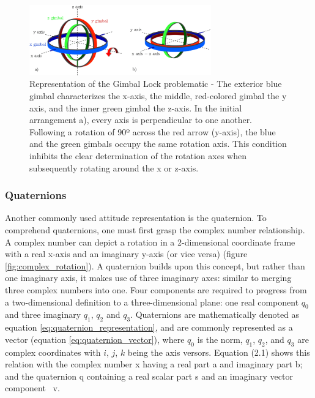 \begin{figure}[!h]
    \centering
    \includegraphics[width=0.7\textwidth]{figures/gimbal_lock.png}
    \caption{Representation of the Gimbal Lock problematic \cite{zeitlhofler2019nominal} - The exterior blue gimbal characterizes the x-axis, the middle, red-colored gimbal the y axis, and the inner green gimbal the z-axis. In the initial arrangement a), every axis is perpendicular to one another. Following a rotation of 90º across the red arrow (y-axis), the blue and the green gimbals occupy the same rotation axis. This condition inhibits the clear determination of the rotation axes when subsequently rotating around the x or z-axis. }
    \label{fig:gimbal_lock}
\end{figure}

\subsubsection{Quaternions}

Another commonly used attitude representation is the quaternion. To comprehend quaternions, one must first grasp the complex number relationship. A complex number can depict a rotation in a 2-dimensional coordinate frame with a real x-axis and an imaginary y-axis (or vice versa) (figure \ref{fig:complex_rotation}). A quaternion builds upon this concept, but rather than one imaginary axis, it makes use of three imaginary axes: similar to merging three complex numbers into one. Four components are required to progress from a two-dimensional definition to a three-dimensional plane: one real component $q_0$ and three imaginary $q_1$, $q_2$ and $q_3$. Quaternions are mathematically denoted as equation \ref{eq:quaternion_representation}, and are commonly represented as a vector (equation \ref{eq:quaternion_vector}), where $q_0$ is the norm, $q_1$, $q_2$, and $q_3$ are complex coordinates with $i$, $j$, $k$ being the axis versors. Equation (2.1) shows this relation with the complex number x having a real part a and imaginary part b; and the quaternion q containing a real scalar part s and an imaginary vector component ~v.

